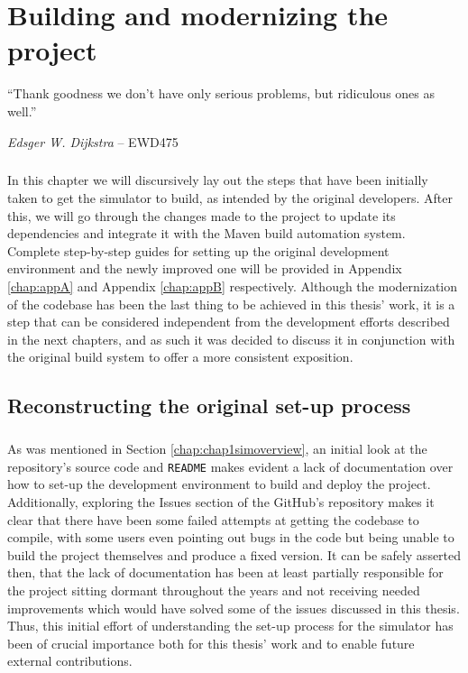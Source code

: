 \chapter{Building and modernizing the project}\label{chap:chap2}

\epigraph{``Thank goodness we don't have only serious problems, but ridiculous ones as well.''}{\textit{Edsger W. Dijkstra} -- EWD475}

\paragraph{}
In this chapter we will discursively lay out the steps that have been initially taken to get the simulator to build, as intended by the original developers. After this, we will go through the changes made to the project to update its dependencies and integrate it with the Maven \cite{mavenweb} build automation system. Complete step-by-step guides for setting up the original development environment and the newly improved one will be provided in Appendix  \ref{chap:appA} and Appendix \ref{chap:appB} respectively. Although the modernization of the codebase has been the last thing to be achieved in this thesis' work, it is a step that can be considered independent from the development efforts described in the next chapters, and as such it was decided to discuss it in conjunction with the original build system to offer a more consistent exposition.

\section{Reconstructing the original set-up process}
\paragraph{}
As was mentioned in Section \ref{chap:chap1simoverview}, an initial look at the repository's source code and \verb|README| makes evident a lack of documentation over how to set-up the development environment to build and deploy the project. Additionally, exploring the Issues section of the GitHub's repository \cite{legv8simARMrepogit} makes it clear that there have been some failed attempts at getting the codebase to compile, with some users even pointing out bugs in the code but being unable to build the project themselves and produce a fixed version. It can be safely asserted then, that the lack of documentation has been at least partially responsible for the project sitting dormant throughout the years and not receiving needed improvements which would have solved some of the issues discussed in this thesis. Thus, this initial effort of understanding the set-up process for the simulator has been of crucial importance both for this thesis' work and to enable future external contributions.
